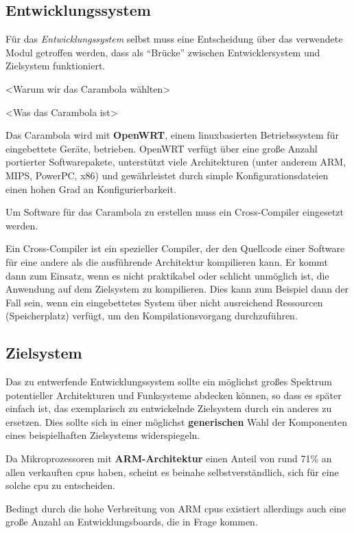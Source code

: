 \subsection{Entwicklungssystem}
Für das \emph{Entwicklungssystem} selbst muss eine Entscheidung über das
verwendete Modul getroffen werden, dass als "`Brücke"' zwischen Entwicklersystem
und Zielsystem funktioniert.

<Warum wir das Carambola wählten>

<Was das Carambola ist>

Das Carambola wird mit \textbf{OpenWRT}, einem linuxbasierten
Betriebssystem für eingebettete Geräte, betrieben. OpenWRT verfügt über eine
große Anzahl portierter Softwarepakete, unterstützt viele Architekturen (unter
anderem ARM, MIPS, PowerPC, x86) und gewährleistet durch simple
Konfigurationsdateien einen hohen Grad an Konfigurierbarkeit.

Um Software für das Carambola zu erstellen muss ein Cross-Compiler eingesetzt
werden.
\begin{definition}
Ein Cross-Compiler ist ein spezieller Compiler, der den Quellcode einer
Software für eine andere als die ausführende Architektur kompilieren kann. Er
kommt dann zum Einsatz, wenn es nicht praktikabel oder schlicht unmöglich ist,
die Anwendung auf dem Zielsystem zu kompilieren. Dies kann zum Beispiel dann der
Fall sein, wenn ein eingebettetes System über nicht ausreichend Ressourcen
(Speicherplatz) verfügt, um den Kompilationsvorgang durchzuführen.
\end{definition}
\subsection{Zielsystem}
Das zu entwerfende Entwicklungssystem sollte ein möglichst
großes Spektrum potentieller Architekturen und Funksysteme abdecken können, so
dass es später einfach ist, das exemplarisch zu entwickelnde Zielsystem durch
ein anderes zu ersetzen. Dies sollte sich in einer möglichst
\textbf{generischen} Wahl der Komponenten eines beispielhaften Zielsystems
widerspiegeln.

Da Mikroprozessoren mit \textbf{ARM-Architektur} einen Anteil von rund
71\%\cite{IDC01} an allen verkauften \glspl{cpu} haben, scheint es beinahe
selbstverständlich, sich für eine solche \gls{cpu} zu entscheiden.

Bedingt durch die hohe Verbreitung von ARM \glspl{cpu} existiert allerdings
auch eine große Anzahl an Entwicklungsboards, die in Frage kommen.

